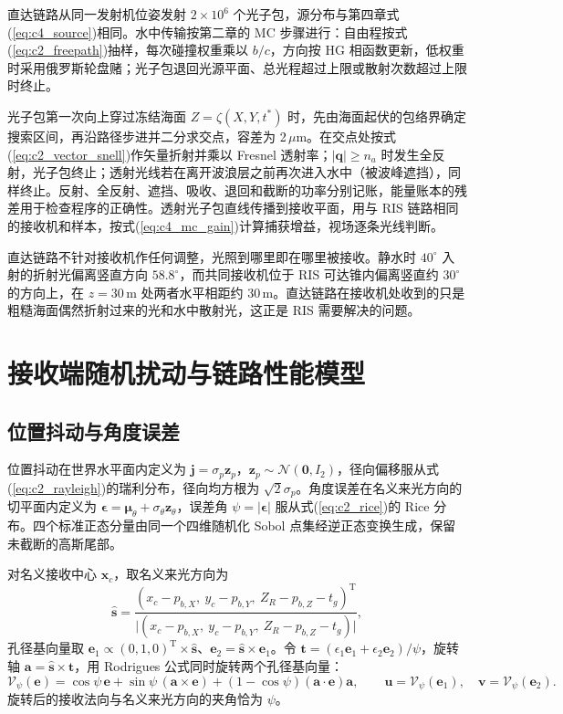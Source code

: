 直达链路从同一发射机位姿发射 $2\times10^6$ 个光子包，源分布与第四章式(\ref{eq:c4_source})相同。水中传输按第二章的 MC 步骤进行：自由程按式(\ref{eq:c2_freepath})抽样，每次碰撞权重乘以 $b/c$，方向按 HG 相函数更新，低权重时采用俄罗斯轮盘赌；光子包退回光源平面、总光程超过上限或散射次数超过上限时终止。

光子包第一次向上穿过冻结海面 $Z=\zeta(X,Y,t^\ast)$ 时，先由海面起伏的包络界确定搜索区间，再沿路径步进并二分求交点，容差为 2\,$\mu$m。在交点处按式(\ref{eq:c2_vector_snell})作矢量折射并乘以 Fresnel 透射率；$|\mathbf q|\ge n_a$ 时发生全反射，光子包终止；透射光线若在离开波浪层之前再次进入水中（被波峰遮挡），同样终止。反射、全反射、遮挡、吸收、退回和截断的功率分别记账，能量账本的残差用于检查程序的正确性。透射光子包直线传播到接收平面，用与 RIS 链路相同的接收机和样本，按式(\ref{eq:c4_mc_gain})计算捕获增益，视场逐条光线判断。

直达链路不针对接收机作任何调整，光照到哪里即在哪里被接收。静水时 $40^\circ$ 入射的折射光偏离竖直方向 $58.8^\circ$，而共同接收机位于 RIS 可达锥内偏离竖直约 $30^\circ$ 的方向上，在 $z=30\,\mathrm m$ 处两者水平相距约 30\,m。直达链路在接收机处收到的只是粗糙海面偶然折射过来的光和水中散射光，这正是 RIS 需要解决的问题。

\section{接收端随机扰动与链路性能模型}
\label{sec:c5_receiver}

\subsection{位置抖动与角度误差}

位置抖动在世界水平面内定义为 $\mathbf j=\sigma_p\mathbf z_p$，$\mathbf z_p\sim\mathcal N(\mathbf 0,I_2)$，径向偏移服从式(\ref{eq:c2_rayleigh})的瑞利分布，径向均方根为 $\sqrt2\sigma_p$。角度误差在名义来光方向的切平面内定义为 $\boldsymbol\epsilon=\boldsymbol\mu_\theta+\sigma_\theta\mathbf z_\theta$，误差角 $\psi=|\boldsymbol\epsilon|$ 服从式(\ref{eq:c2_rice})的 Rice 分布。四个标准正态分量由同一个四维随机化 Sobol 点集经逆正态变换生成，保留未截断的高斯尾部。

对名义接收中心 $\mathbf x_c$，取名义来光方向为
\begin{equation}
\hat{\mathbf s}=\frac{(x_c-p_{b,X},\ y_c-p_{b,Y},\ Z_R-p_{b,Z}-t_g)^{\mathrm T}}{\big|(x_c-p_{b,X},\ y_c-p_{b,Y},\ Z_R-p_{b,Z}-t_g)\big|},
\label{eq:c5_nominal}
\end{equation}
孔径基向量取 $\mathbf e_1\propto(0,1,0)^{\mathrm T}\times\hat{\mathbf s}$、$\mathbf e_2=\hat{\mathbf s}\times\mathbf e_1$。令 $\mathbf t=(\epsilon_1\mathbf e_1+\epsilon_2\mathbf e_2)/\psi$，旋转轴 $\mathbf a=\hat{\mathbf s}\times\mathbf t$，用 Rodrigues 公式同时旋转两个孔径基向量：
\begin{equation}
\mathcal V_\psi(\mathbf e)=\cos\psi\,\mathbf e+\sin\psi\,(\mathbf a\times\mathbf e)+(1-\cos\psi)(\mathbf a\cdot\mathbf e)\mathbf a,\qquad
\mathbf u=\mathcal V_\psi(\mathbf e_1),\quad \mathbf v=\mathcal V_\psi(\mathbf e_2).
\label{eq:c5_rodrigues}
\end{equation}
旋转后的接收法向与名义来光方向的夹角恰为 $\psi$。

